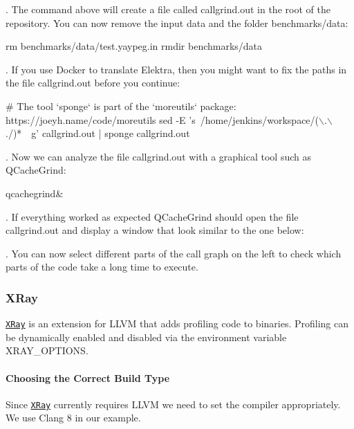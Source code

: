 . The command above will create a file called {\ttfamily callgrind.\+out} in the root of the repository. You can now remove the input data and the folder {\ttfamily benchmarks/data}\+:


\begin{DoxyCode}
rm benchmarks/data/test.yaypeg.in
rmdir benchmarks/data
\end{DoxyCode}


. If you use Docker to translate Elektra, then you might want to fix the paths in the file {\ttfamily callgrind.\+out} before you continue\+:


\begin{DoxyCode}
# The tool `sponge` is part of the `moreutils` package: https://joeyh.name/code/moreutils
sed -E 's~/home/jenkins/workspace/(\(\backslash\).\(\backslash\)./)*~~g' callgrind.out | sponge callgrind.out
\end{DoxyCode}


. Now we can analyze the file {\ttfamily callgrind.\+out} with a graphical tool such as Q\+Cache\+Grind\+:


\begin{DoxyCode}
qcachegrind&
\end{DoxyCode}


. If everything worked as expected Q\+Cache\+Grind should open the file {\ttfamily callgrind.\+out} and display a window that look similar to the one below\+:



. You can now select different parts of the call graph on the left to check which parts of the code take a long time to execute.

\subsubsection*{X\+Ray}

\href{https://llvm.org/docs/XRay.html}{\tt X\+Ray} is an extension for L\+L\+VM that adds profiling code to binaries. Profiling can be dynamically enabled and disabled via the environment variable {\ttfamily X\+R\+A\+Y\+\_\+\+O\+P\+T\+I\+O\+NS}.

\paragraph*{Choosing the Correct Build Type}

Since \href{https://llvm.org/docs/XRay.html}{\tt X\+Ray} currently requires L\+L\+VM we need to set the compiler appropriately. We use Clang 8 in our example.


